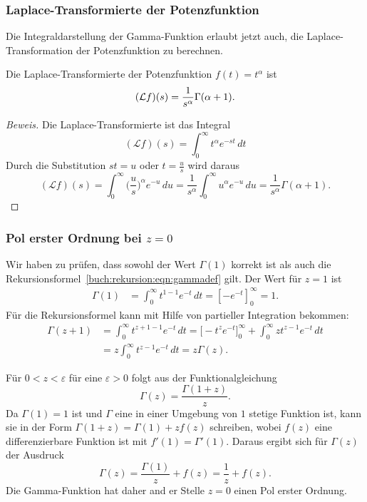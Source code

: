 
\subsubsection{Laplace-Transformierte der Potenzfunktion}
Die Integraldarstellung der Gamma-Funktion erlaubt jetzt auch, die
Laplace-Transformation der Potenzfunktion zu berechnen.

\begin{satz}
Die Laplace-Transformierte der Potenzfunktion $f(t)=t^\alpha$ ist
\[
(\mathcal{L}f)(s)
=
\frac{1}{s^\alpha} \Gamma(\alpha+1).
\qedhere
\]
\end{satz}

\begin{proof}[Beweis]
Die Laplace-Transformierte ist das Integral
\[
(\mathcal{L}f)(s)
=
\int_0^\infty t^\alpha e^{-st}\,dt
\]
Durch die Substitution $st = u$ oder $t=\frac{u}{s}$ wird daraus
\[
(\mathcal{L}f)(s)
=
\int_0^\infty \biggl(\frac{u}{s}\biggr)^\alpha e^{-u}\,du
=
\frac{1}{s^\alpha}\int_0^\infty u^{\alpha} e^{-u}\,du
=
\frac{1}{s^\alpha} \Gamma(\alpha+1).
\]
\end{proof}

\subsubsection{Pol erster Ordnung bei $z=0$}
Wir haben zu prüfen, dass sowohl der Wert $\Gamma(1)$ korrekt ist als
auch die Rekursionsformel~\eqref{buch:rekursion:eqn:gammadef} gilt.
Der Wert für $z=1$ ist
\begin{align*}
\Gamma(1)
&=
\int_0^\infty t^{1-1}e^{-t}\,dt
=
\left[ -e^{-t} \right]_0^\infty
=
1.
\end{align*}
Für die Rekursionsformel kann mit Hilfe von partieller Integration
bekommen:
\begin{align*}
\Gamma(z+1)
&=
\int_0^\infty t^{z+1-1}e^{-t}\,dt
=
\biggl[-t^{z}e^{-t}\biggr]_0^\infty
+
\int_0^\infty z t^{z-1}e^{-t}\,dt
\\
&=
z
\int_0^\infty
t^{z-1}e^{-t}\,dt
=
z \Gamma(z).
\end{align*}

Für $0<z<\varepsilon$ für eine $\varepsilon >0$ folgt aus der 
Funktionalgleichung
\[
\Gamma(z) = \frac{\Gamma(1+z)}{z}.
\]
Da $\Gamma(1)=1$ ist und $\Gamma$ eine in einer
Umgebung von $1$ stetige Funktion ist, kann sie in der Form
\(
\Gamma(1+z)=\Gamma(1) + zf(z)
\)
schreiben, wobei  $f(z)$ eine differenzierbare Funktion ist mit
$f'(1)=\Gamma'(1)$.
Daraus ergibt sich für $\Gamma(z)$ der Ausdruck
\[
\Gamma(z) = \frac{\Gamma(1)}{z} + f(z) = \frac{1}{z} + f(z).
\]
Die Gamma-Funktion hat daher and er Stelle $z=0$ einen Pol erster Ordnung.

